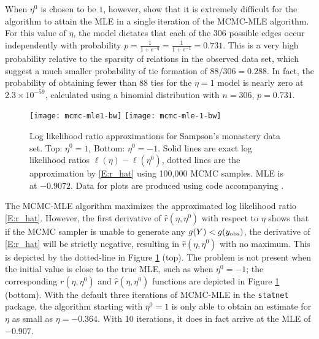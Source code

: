 When $\eta^0$ is chosen to be $1$, however, \citeauthor{ergm} show that it is
extremely difficult for the algorithm to attain the MLE in a single iteration of 
the MCMC-MLE algorithm.  
For this value of $\eta$, the model dictates that each of the 306 possible edges occur independently with probability $p = \frac{1}{1+e^{-\eta}} = \frac{1}{1+e^{-1}} = 0.731$.   
This is a very high probability relative to the sparsity of relations in the observed data 
set, which suggest a much smaller probability of tie formation of $88/306= 0.288$.  
In fact, the probability of obtaining fewer than 88 ties for the $\eta=1$ model is nearly zero at $2.3 \times 10^{-59}$, calculated using a binomial distribution with $n=306$, $p =0.731$.  

\begin{figure}[h!]  
\begin{center} 
{\texttt{[image: mcmc-mle1-bw]}}
{\texttt{[image: mcmc-mle-1-bw]}}
\end{center} 
\caption[Log likelihood ratio approximations for Sampson's monastery data set]{Log likelihood ratio approximations for Sampson's monastery data set.  Top: $\eta^0 = 1$, Bottom: $\eta^0 = -1$. Solid lines are exact log likelihood ratios $\ell(\eta) - \ell(\eta^0)$, dotted lines are the 
approximation by \eqref{E:r_hat} using 100,000 MCMC samples.  
MLE is at $-0.9072$.
Data for plots are produced using code accompanying \citet{Hummel}.} 
\label{F:MCMC-MLE}
\end{figure} 

The MCMC-MLE algorithm maximizes the approximated log 
likelihood ratio \eqref{E:r_hat}.  However, the first derivative of $\hat{r}(\eta,\eta^0)$ with respect
to $\eta$ shows that if the MCMC sampler is unable to generate any $g(Y)< g(y_{\text{obs}})$, 
the derivative of 
\eqref{E:r_hat} will be strictly negative, resulting in $\hat{r}(\eta,\eta^0)$ with no
maximum.  This is depicted by the dotted-line in Figure \ref{F:MCMC-MLE} (top).  
The problem is not present when the initial value is close to the true MLE, such as 
when $\eta^0 = -1$; the corresponding $r(\eta,\eta^0)$ and $\hat{r}(\eta,\eta^0)$ 
functions are depicted in Figure \ref{F:MCMC-MLE} (bottom).  With the default three 
iterations of MCMC-MLE in the \texttt{statnet} package, the algorithm 
starting with $\eta^0 = 1$ is only able to obtain an estimate for $\eta$ as 
small as $\eta = -0.364$.  With 10 iterations, it does in fact 
arrive at the MLE of $-0.907$.

